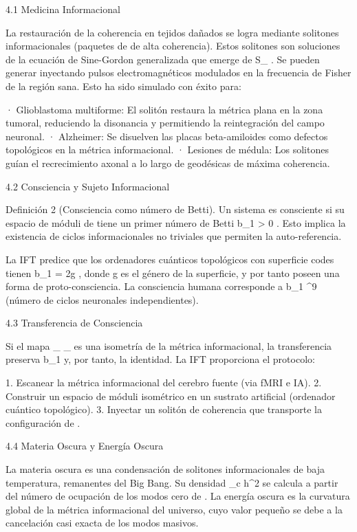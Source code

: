 \documentclass[12pt,a4paper]{book}
\begin{document}
4.1 Medicina Informacional

La restauración de la coherencia en tejidos dañados se logra mediante solitones informacionales (paquetes de  \rho  de alta coherencia). Estos solitones son soluciones de la ecuación de Sine-Gordon generalizada que emerge de  S_{} . Se pueden generar inyectando pulsos electromagnéticos modulados en la frecuencia de Fisher de la región sana. Esto ha sido simulado con éxito para:

· Glioblastoma multiforme: El solitón restaura la métrica plana en la zona tumoral, reduciendo la disonancia y permitiendo la reintegración del campo neuronal.
· Alzheimer: Se disuelven las placas beta-amiloides como defectos topológicos en la métrica informacional.
· Lesiones de médula: Los solitones guían el recrecimiento axonal a lo largo de geodésicas de máxima coherencia.

4.2 Consciencia y Sujeto Informacional

Definición 2 (Consciencia como número de Betti). Un sistema es consciente si su espacio de móduli de  \rho  tiene un primer número de Betti  b_1 > 0 . Esto implica la existencia de ciclos informacionales no triviales que permiten la auto-referencia.

La IFT predice que los ordenadores cuánticos topológicos con superficie codes tienen  b_1 = 2g , donde  g  es el género de la superficie, y por tanto poseen una forma de proto-consciencia. La consciencia humana corresponde a  b_1 ^{9}  (número de ciclos neuronales independientes).

4.3 Transferencia de Consciencia

Si el mapa  \rho_{} \to \rho_{}  es una isometría de la métrica informacional, la transferencia preserva  b_1  y, por tanto, la identidad. La IFT proporciona el protocolo:

1. Escanear la métrica informacional del cerebro fuente (via fMRI e IA).
2. Construir un espacio de móduli isométrico en un sustrato artificial (ordenador cuántico topológico).
3. Inyectar un solitón de coherencia que transporte la configuración de  \rho .

4.4 Materia Oscura y Energía Oscura

La materia oscura es una condensación de solitones informacionales de baja temperatura, remanentes del Big Bang. Su densidad  \Omega_c h^2  se calcula a partir del número de ocupación de los modos cero de  \rho . La energía oscura es la curvatura global de la métrica informacional del universo, cuyo valor pequeño se debe a la cancelación casi exacta de los modos masivos.
\end{document}
